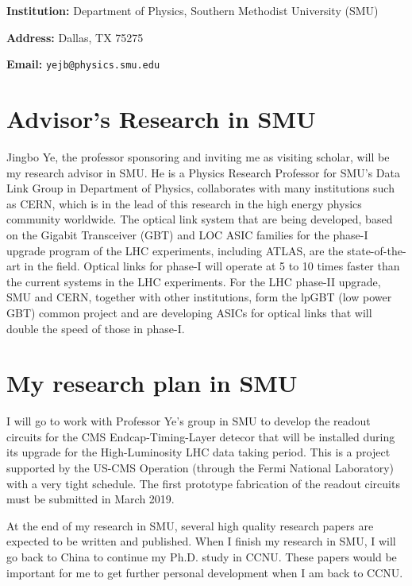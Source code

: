 \documentclass[11pt,a4paper]{article}
\begin{document}
\begin{spacing}{1.2}
\begin{multicols}{2}

\textbf{Institution:} Department of Physics, Southern Methodist University (SMU)

\textbf{Address:} Dallas, TX 75275 
 
\textbf{Email:} \texttt{yejb@physics.smu.edu} 

\end{multicols}

\section*{Advisor's Research in SMU}     %
Jingbo Ye, the professor sponsoring and inviting me as visiting scholar, will be my research advisor in SMU. He is a Physics Research Professor for SMU's Data Link Group in Department of Physics, collaborates with many institutions such as CERN, which is in the lead of this research in the high energy physics community worldwide. The optical link system that are being developed, based on the Gigabit Transceiver (GBT) and LOC ASIC families for the phase-I upgrade program of the LHC experiments, including ATLAS, are the state-of-the-art in the field. Optical links for phase-I will operate at 5 to 10 times faster than the current systems in the LHC experiments. For the LHC phase-II upgrade, SMU and CERN, together with other institutions, form the lpGBT (low power GBT) common project and are developing ASICs for optical links that will double the speed of those in phase-I.

\section*{My research plan in SMU}     %
I will go to work with Professor Ye's group in SMU to develop the readout circuits for the CMS Endcap-Timing-Layer detecor that will be installed during its upgrade for the High-Luminosity LHC data taking period. This is a project supported by the US-CMS Operation (through the Fermi National Laboratory) with a very tight schedule. The first prototype fabrication of the readout circuits must be submitted in March 2019.

At the end of my research in SMU, several high quality research papers are expected to be written and published. When I finish my research in SMU, I will go back to China to continue my Ph.D. study in CCNU. These papers would be important for me to get further personal development when I am back to CCNU.



\end{spacing}
\end{document}
